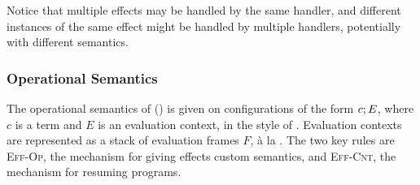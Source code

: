 Notice that multiple effects may be handled by the same handler, and different instances of the same effect might be handled by multiple handlers, potentially with different semantics. 

\subsubsection{Operational Semantics}
The operational semantics of \efflang{} () is given on configurations of the form ${c}; {E}$, where $c$ is a term and $E$ is an evaluation context, in the style of \citet{felleisen-87}. Evaluation contexts are represented as a stack of evaluation frames $F$, à la \citet{kiselyov-2012}. The two key rules are \textsc{Eff-Op}, the mechanism for giving effects custom semantics, and \textsc{Eff-Cnt}, the mechanism for resuming programs. 

